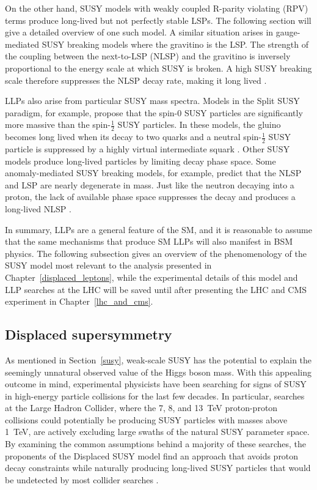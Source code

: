 On the other hand, SUSY models with weakly coupled R-parity violating (RPV) terms produce long-lived but not perfectly stable LSPs. The following section will give a detailed overview of one such model. A similar situation arises in gauge-mediated SUSY breaking models where the gravitino is the LSP. The strength of the coupling between the next-to-LSP (NLSP) and the gravitino is inversely proportional to the energy scale at which SUSY is broken. A high SUSY breaking scale therefore suppresses the NLSP decay rate, making it long lived \cite{liu_2015}.

LLPs also arise from particular SUSY mass spectra. Models in the Split SUSY paradigm, for example, propose that the spin-0 SUSY particles are significantly more massive than the spin-$\frac{1}{2}$ SUSY particles. In these models, the gluino becomes long lived when its decay to two quarks and a neutral spin-$\frac{1}{2}$ SUSY particle is suppressed by a highly virtual intermediate squark \cite{split_susy_colliders}. Other SUSY models produce long-lived particles by limiting decay phase space. Some anomaly-mediated SUSY breaking models, for example, predict that the NLSP and LSP are nearly degenerate in mass. Just like the neutron decaying into a proton, the lack of available phase space suppresses the decay and produces a long-lived NLSP \cite{amsb_at_lhc}.

In summary, LLPs are a general feature of the SM, and it is reasonable to assume that the same mechanisms that produce SM LLPs will also manifest in BSM physics. The following subsection gives an overview of the phenomenology of the SUSY model most relevant to the analysis presented in Chapter~\ref{displaced_leptons}, while the experimental details of this model and LLP searches at the LHC will be saved until after presenting the LHC and CMS experiment in Chapter~\ref{lhc_and_cms}.

\subsection{Displaced supersymmetry}
As mentioned in Section~\ref{susy}, weak-scale SUSY has the potential to explain the seemingly unnatural observed value of the Higgs boson mass. With this appealing outcome in mind, experimental physicists have been searching for signs of SUSY in high-energy particle collisions for the last few decades. In particular, searches at the Large Hadron Collider, where the \num{7}, \num{8}, and \SI{13}{\TeV} proton-proton collisions could potentially be producing SUSY particles with masses above \SI{1}{\TeV}, are actively excluding large swaths of the natural SUSY parameter space. By examining the common assumptions behind a majority of these searches, the proponents of the Displaced SUSY model find an approach that avoids proton decay constraints while naturally producing long-lived SUSY particles that would be undetected by most collider searches \cite{displaced_susy}.

